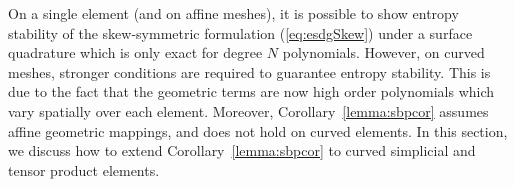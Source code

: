 \documentclass[review]{siamart0216}
\theoremstyle{assumption}
\newcommand{\pd}[2]{\frac{\partial#1}{\partial#2}}
\newcommand{\LRp}[1]{\left( #1 \right)}
\newcommand{\LRs}[1]{\left[ #1 \right]}
\newcommand{\note}[1]{{\color{blue}{#1}}}
\newcommand{\diag}[1]{{\rm diag}\LRp{#1}}
\begin{document}
%
%
%


On a single element (and on affine meshes), it is possible to show entropy stability of the skew-symmetric formulation (\ref{eq:esdgSkew}) under a surface quadrature which is only exact for degree $N$ polynomials.  However, on curved meshes, stronger conditions are required to guarantee entropy stability.  This is due to the fact that the geometric terms are now high order polynomials which vary spatially over each element.  Moreover, Corollary~\ref{lemma:sbpcor} assumes affine geometric mappings, and does not hold on curved elements.  In this section, we discuss how to extend Corollary~\ref{lemma:sbpcor} to curved simplicial and tensor product elements.  
\end{document}
